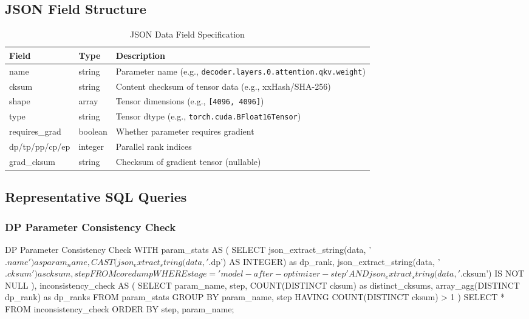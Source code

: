 \documentclass[sigconf,nonacm]{acmart}
\begin{document}
\subsection{JSON Field Structure}

\begin{table}[H]
\centering
\footnotesize
\caption{JSON Data Field Specification}
\label{tab:json_schema}
\begin{tabularx}{\linewidth}{llX}
\toprule
\textbf{Field} & \textbf{Type} & \textbf{Description} \\
\midrule
name & string & Parameter name (e.g., \texttt{decoder.layers.0.attention.qkv.weight}) \\
cksum & string & Content checksum of tensor data (e.g., xxHash/SHA-256) \\
shape & array & Tensor dimensions (e.g., \texttt{[4096, 4096]}) \\
type & string & Tensor dtype (e.g., \texttt{torch.cuda.BFloat16Tensor}) \\
requires\_grad & boolean & Whether parameter requires gradient \\
dp/tp/pp/cp/ep & integer & Parallel rank indices \\
grad\_cksum & string & Checksum of gradient tensor (nullable) \\
\bottomrule
\end{tabularx}
\end{table}

\subsection{Representative SQL Queries}

\subsubsection{DP Parameter Consistency Check}

\begin{sqlcode}{DP Parameter Consistency Check}
WITH param_stats AS (
    SELECT
        json_extract_string(data, '$.name') as param_name,
        CAST(json_extract_string(data, '$.dp') AS INTEGER) as dp_rank,
        json_extract_string(data, '$.cksum') as cksum,
        step
    FROM coredump
    WHERE stage = 'model-after-optimizer-step'
      AND json_extract_string(data, '$.cksum') IS NOT NULL
),
inconsistency_check AS (
    SELECT
        param_name, step,
        COUNT(DISTINCT cksum) as distinct_cksums,
        array_agg(DISTINCT dp_rank) as dp_ranks
    FROM param_stats
    GROUP BY param_name, step
    HAVING COUNT(DISTINCT cksum) > 1
)
SELECT * FROM inconsistency_check ORDER BY step, param_name;
\end{sqlcode}
\end{document}
